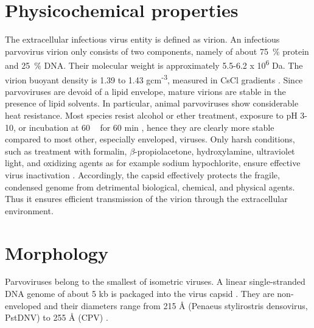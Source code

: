 \section{Physicochemical properties}
The extracellular infectious virus entity is defined as virion. An infectious parvovirus virion only consists of two components, namely of about 75~\% protein and 25~\% DNA. Their molecular weight is approximately 5.5-6.2 x 10\textsuperscript{6} Da. The virion buoyant density is 1.39 to 1.43 gcm\textsuperscript{-3}, measured in CsCl gradients \cite{CsCl, pmid4317344}. Since parvoviruses are devoid of a lipid envelope, mature virions are stable in the presence of lipid solvents. In particular, animal parvoviruses show considerable heat resistance. Most species resist alcohol or ether treatment, exposure to pH 3-10, or incubation at 60 \textcelsius~ for 60 min \cite{pmid12935806, pmid12385412, pmid17880601, pmid19039515, pmid14660623, pmid10941577}, hence they are clearly more stable compared to most other, especially enveloped, viruses. Only harsh conditions, such as treatment with formalin, $\beta$-propiolacetone, hydroxylamine, ultraviolet light, and oxidizing agents as for example sodium hypochlorite, ensure effective virus inactivation \cite{pmid4213983, pmid3416941, pmid7848502, pmid1520981}. Accordingly, the capsid effectively protects the fragile, condensed genome from detrimental biological, chemical, and physical agents. Thus it ensures efficient transmission of the virion through the extracellular environment.     


\section{Morphology}
\label{sec:Morphology}

Parvoviruses belong to the smallest of isometric viruses. A linear single-stranded DNA genome of about 5 kb is packaged into the virus capsid \cite{pmid4975639, pmid5264145, pmid5429749}. They are non-enveloped and their diameters range from 215 \r{A} (Penaeus stylirostris densovirus, PstDNV) to 255 \r{A} (CPV) \cite{pmid10497831, icvt}. 

